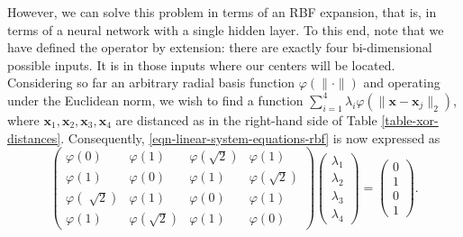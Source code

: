 \documentclass[12pt]{report} %
\newcommand{\tmmathbf}[1]{\ensuremath{\boldsymbol{#1}}}
\newcommand{\tmverbatim}[1]{\text{{\ttfamily{#1}}}}
\begin{document}
However, we can solve this problem in terms of an RBF expansion, that is, in
terms of a neural network with a single hidden layer. To this end, note that
we have defined the \tmverbatim{xor} operator by extension: there are exactly
four bi-dimensional possible inputs. It is in those inputs where our centers will be located.
Considering so far an arbitrary radial basis function $\varphi (\| \cdot \|)$
and operating under the Euclidean norm, we wish to find a function $\sum_{i =
    1}^4 \lambda_i \varphi (\| \tmmathbf{x}-\tmmathbf{x}_j \|_2)$, where
$\tmmathbf{x}_1, \tmmathbf{x}_2, \tmmathbf{x}_3, \tmmathbf{x}_4$ are distanced as in the
right-hand side of Table \ref{table-xor-distances}. Consequently,
\eqref{eqn-linear-system-equations-rbf} is now expressed as
\begin{equation}
  \left(\begin{array}{cccc}
      \varphi (0)                       & \varphi (1)                     & \varphi \left( \sqrt{2} \right) & \varphi
      (1)                                                                                                                             \\
      \varphi (1)                       & \varphi (0)                     & \varphi (1)                     & \varphi \left( \sqrt{2}
      \right)                                                                                                                         \\
      \varphi \left( \sqrt[]{2} \right) & \varphi (1)                     & \varphi (0)                     & \varphi
      (1)                                                                                                                             \\
      \varphi (1)                       & \varphi \left( \sqrt{2} \right) & \varphi (1)                     & \varphi (0)
    \end{array}\right) \left(\begin{array}{c}
      \lambda_1 \\
      \lambda_2 \\
      \lambda_3 \\
      \lambda_4
    \end{array}\right) = \left(\begin{array}{c}
      0 \\
      1 \\
      0 \\
      1
    \end{array}\right) .\label{interpolationconditionxor}
\end{equation}
\end{document}
